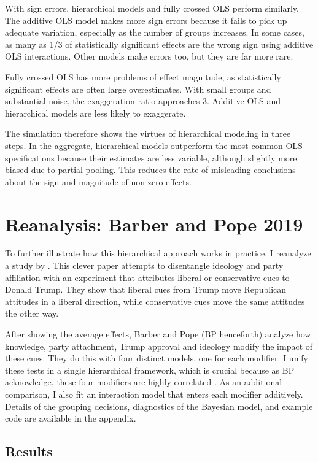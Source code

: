 \documentclass[12pt]{article}
\begin{document}
With sign errors, hierarchical models and fully crossed OLS perform similarly.
The additive OLS model makes more sign errors because it fails to pick up adequate variation, especially as the number of groups increases. 
In some cases, as many as 1/3 of statistically significant effects are the wrong sign using additive OLS interactions. 
Other models make errors too, but they are far more rare. 


Fully crossed OLS has more problems of effect magnitude, as statistically significant effects are often large overestimates. 
With small groups and substantial noise, the exaggeration ratio approaches 3. 
Additive OLS and hierarchical models are less likely to exaggerate.


The simulation therefore shows the virtues of hierarchical modeling in three steps. 
In the aggregate, hierarchical models outperform the most common OLS specifications because their estimates are less variable, although slightly more biased due to partial pooling.
This reduces the rate of misleading conclusions about the sign and magnitude of non-zero effects.



\section{Reanalysis: Barber and Pope 2019}


To further illustrate how this hierarchical approach works in practice, I reanalyze a study by \citet{BarberPope2019}.
This clever paper attempts to disentangle ideology and party affiliation with an experiment that attributes liberal or conservative cues to Donald Trump. 
They show that liberal cues from Trump move Republican attitudes in a liberal direction, while conservative cues move the same attitudes the other way.


After showing the average effects, Barber and Pope (BP henceforth) analyze how knowledge, party attachment, Trump approval and ideology modify the impact of these cues. 
They do this with four distinct models, one for each modifier.
I unify these tests in a single hierarchical framework, which is crucial because as BP acknowledge, these four modifiers are highly correlated \citep[pg. 50]{BarberPope2019}. 
As an additional comparison, I also fit an interaction model that enters each modifier additively. 
Details of the grouping decisions, diagnostics of the Bayesian model, and example code are available in the appendix.


\subsection{Results}
\end{document}
